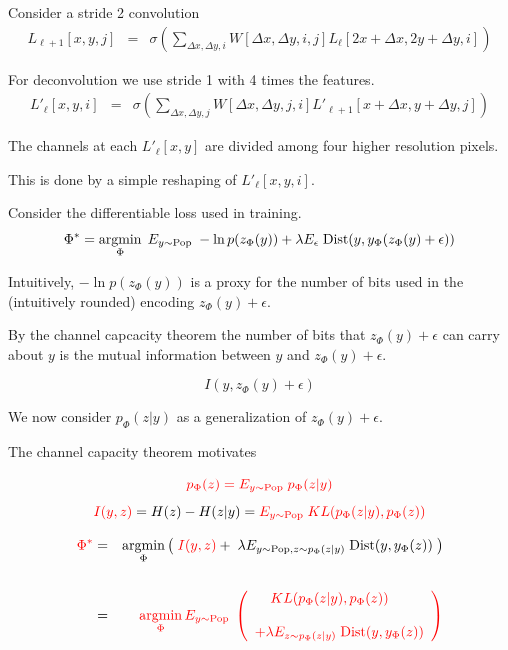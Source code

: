 {Consider a stride 2 convolution
\begin{eqnarray*}
  L_{\ell+1}[x,y,j] & = & \sigma\left(\sum_{\Delta x,\Delta y,i}   W[\Delta x, \Delta y, i,j] L_\ell[2x + \Delta x, 2y + \Delta y, i]\right)
\end{eqnarray*}

\vfill
For deconvolution we use stride 1 with 4 times the features.
\begin{eqnarray*}
  L'_\ell[x,y,i] & = & \sigma\left(\sum_{\Delta x,\Delta y,j}   W[\Delta x, \Delta y, j,i] L'_{\ell+1}[x + \Delta x, y + \Delta y, j]\right)
\end{eqnarray*}

\vfill
The channels at each $L'_\ell[x,y]$ are divided among four higher resolution pixels.

\vfill
This is done by a simple reshaping of $L'_\ell[x,y,i]$.


Consider the differentiable loss used in training.
{\color{red} $$\Phi^* = \operatorname*{argmin}_\Phi \;E_{y \sim \mathrm{Pop}}\;- \ln p(z_\Phi(y)) + \lambda E_\epsilon\; \mathrm{Dist}(y,y_\Phi(z_\Phi(y) + \epsilon))$$}

Intuitively, {\color{red} $- \ln p(z_\Phi(y))$} is a proxy for the number of bits used in the (intuitively rounded) encoding {\color{red} $z_\Phi(y) + \epsilon$}.

\vfill
By the channel capcacity theorem the number of bits that {\color{red} $z_\Phi(y) + \epsilon$} can carry about {\color{red} $y$}
is the mutual information between $y$ and $z_\Phi(y) + \epsilon$.

{\color{red} $$I(y,z_\Phi(y)+\epsilon)$$}


We now consider {\color{red} $p_\Phi(z|y)$} as a generalization of {\color{red} $z_\Phi(y) + \epsilon$}.

\vfill
The channel capacity theorem motivates

$${\color{red} p_\Phi(z) = E_{y \sim \mathrm{Pop}}\;p_\Phi(z|y)}$$
$${\color{red} I(y,z)} = H(z) - H(z|y) = {\color{red} E_{y \sim \mathrm{Pop}}\;KL(p_\Phi(z|y),p_\Phi(z))}$$


\vfill
{\huge
\begin{eqnarray*}
{\color{red} \Phi^*} & = & \operatorname*{argmin}_\Phi \left(\;{\color{red} I(y,z)} + \;\lambda E_{y \sim \mathrm{Pop},z \sim p_\Phi(z|y)}\;\mathrm{Dist}(y,y_\Phi(z))\;\right) \\
\\
& = & {\color{red} \operatorname*{argmin}_\Phi  E_{y \sim \mathrm{Pop}}\;\left(\begin{array}{l}\;\;\;\;KL(p_\Phi(z|y),p_\Phi(z)) \\
\\
+ \lambda E_{z \sim p_\Phi(z|y)}\; \mathrm{Dist}(y,y_\Phi(z))\end{array}\right)}
\end{eqnarray*}
}

}
